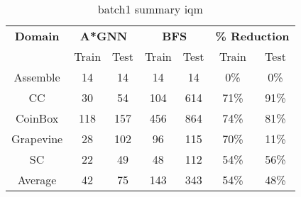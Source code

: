 \begin{table}[!ht]
  \small
  \centering
  \begin{tabular}{c|cc|cc|cc}
    \textbf{Domain}
      & \multicolumn{2}{c|}{\textbf{A*GNN}}
      & \multicolumn{2}{c|}{\textbf{BFS}}
      & \multicolumn{2}{c}{\textbf{\% Reduction}} \\
    \cline{2-7}
    & Train & Test & Train & Test & Train & Test \\
    \hline

    Assemble & 14 & 14 & 14 & 14 & 0\% & 0\% \\
    CC & 30 & 54 & 104 & 614 & 71\% & 91\% \\
    CoinBox & 118 & 157 & 456 & 864 & 74\% & 81\% \\
    Grapevine & 28 & 102 & 96 & 115 & 70\% & 11\% \\
    SC & 22 & 49 & 48 & 112 & 54\% & 56\% \\
    \hline
    Average & 42 & 75 & 143 & 343 & 54\% & 48\% \\

  \end{tabular}
  \caption{batch1 summary iqm}
  \label{tab:batch1_res}
\end{table}
